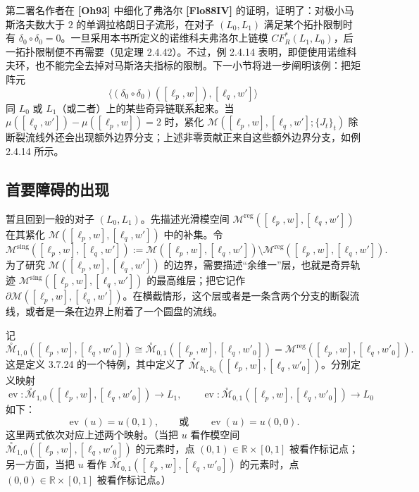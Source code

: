 第二署名作者在 \textbf{[Oh93]} 中细化了弗洛尔 \textbf{[Flo88IV]} 的证明，证明了：对极小马斯洛夫数大于 $2$ 的单调拉格朗日子流形，在对子 $(L_0,L_1)$ 满足某个拓扑限制时有 $\delta_0\circ\delta_0=0$。一旦采用本书所定义的诺维科夫弗洛尔上链模 $CF_R^*(L_1,L_0)$，后一拓扑限制便不再需要（见定理 2.4.42）。不过，例 2.4.14 表明，即便使用诺维科夫环，也不能完全去掉对马斯洛夫指标的限制。下一小节将进一步阐明该例：把矩阵元
\[
  \bigl\langle(\delta_0\circ\delta_0)([\ell_p,w]),
    [\ell_q,w']\bigr\rangle
\]
同 $L_0$ 或 $L_1$（或二者）上的某些奇异链联系起来。当
$\mu([\ell_q,w'])-\mu([\ell_p,w])=2$ 时，紧化
$\mathcal M([\ell_p,w],[\ell_q,w'];\{J_t\}_t)$ 除断裂流线外还会出现额外边界分支；上述非零贡献正来自这些额外边界分支，如例 2.4.14 所示。

\subsection{首要障碍的出现}
\label{sec:2-4-5}

暂且回到一般的对子 $(L_0,L_1)$。先描述光滑模空间
$\mathcal M^{\mathrm{reg}}([\ell_p,w],[\ell_q,w'])$ 在其紧化
$\mathcal M([\ell_p,w],[\ell_q,w'])$ 中的补集。令
\[
  \mathcal M^{\mathrm{sing}}([\ell_p,w],[\ell_q,w'])
  :=\mathcal M([\ell_p,w],[\ell_q,w'])
    \setminus\mathcal M^{\mathrm{reg}}([\ell_p,w],[\ell_q,w']).
\]
为了研究 $\mathcal M([\ell_p,w],[\ell_q,w'])$ 的边界，需要描述“余维一”层，也就是奇异轨迹
$\mathcal M^{\mathrm{sing}}([\ell_p,w],[\ell_q,w'])$ 的最高维层；把它记作
$\partial\mathcal M([\ell_p,w],[\ell_q,w'])$。在横截情形，这个层或者是一条含两个分支的断裂流线，或者是一条在边界上附着了一个圆盘的流线。

记
\begin{equation}
  \overset{\circ}{\mathcal M}_{1,0}
    ([\ell_p,w],[\ell_q,w'_0])
  \cong
  \overset{\circ}{\mathcal M}_{0,1}
    ([\ell_p,w],[\ell_q,w'_0])
  =\mathcal M^{\mathrm{reg}}([\ell_p,w],[\ell_q,w'_0]).
  \tag{2.4.27}\label{eq:2-4-27}
\end{equation}
这是定义 3.7.24 的一个特例，其中定义了
$\overset{\circ}{\mathcal M}_{k_1,k_0}
([\ell_p,w],[\ell_q,w'_0])$。分别定义映射
\[
  \operatorname{ev}:\overset{\circ}{\mathcal M}_{1,0}
    ([\ell_p,w],[\ell_q,w'_0])\longrightarrow L_1,
  \qquad
  \operatorname{ev}:\overset{\circ}{\mathcal M}_{0,1}
    ([\ell_p,w],[\ell_q,w'_0])\longrightarrow L_0
\]
如下：
\begin{equation}
  \operatorname{ev}(u)=u(0,1),
  \qquad\text{或}\qquad
  \operatorname{ev}(u)=u(0,0).
  \tag{2.4.28}\label{eq:2-4-28}
\end{equation}
这里两式依次对应上述两个映射。（当把 $u$ 看作模空间
$\overset{\circ}{\mathcal M}_{1,0}([\ell_p,w],[\ell_q,w'_0])$ 的元素时，点
$(0,1)\in\mathbb R\times[0,1]$ 被看作标记点；另一方面，当把 $u$ 看作
$\overset{\circ}{\mathcal M}_{0,1}([\ell_p,w],[\ell_q,w'_0])$ 的元素时，点
$(0,0)\in\mathbb R\times[0,1]$ 被看作标记点。）

